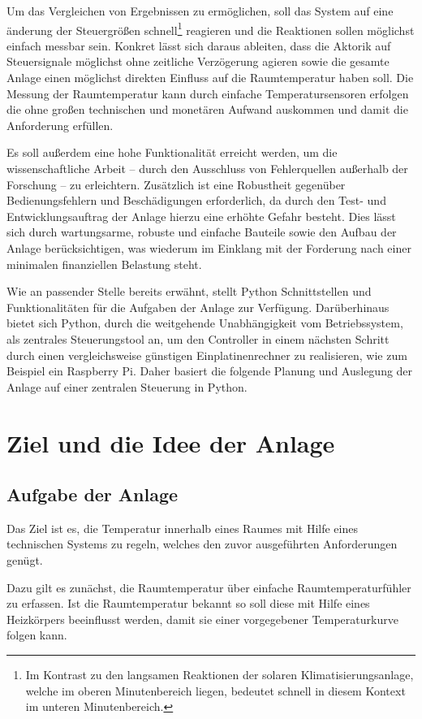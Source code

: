 Um das Vergleichen von Ergebnissen zu ermöglichen, soll das System auf eine änderung der Steuergrößen schnell\footnote{Im Kontrast zu den langsamen Reaktionen der solaren Klimatisierungsanlage, welche im oberen Minutenbereich liegen, bedeutet schnell in diesem Kontext im unteren Minutenbereich.} reagieren und die Reaktionen sollen möglichst einfach messbar sein. 
Konkret lässt sich daraus ableiten, dass die Aktorik auf Steuersignale möglichst ohne zeitliche Verzögerung agieren sowie die gesamte Anlage einen möglichst direkten Einfluss auf die Raumtemperatur haben soll. 
Die Messung der Raumtemperatur kann durch einfache Temperatursensoren erfolgen die ohne großen technischen und monetären Aufwand auskommen und damit die Anforderung erfüllen.

Es soll außerdem eine hohe Funktionalität erreicht werden, um die wissenschaftliche Arbeit -- durch den Ausschluss von Fehlerquellen außerhalb der Forschung -- zu erleichtern. 
Zusätzlich ist eine Robustheit gegenüber Bedienungsfehlern und Beschädigungen erforderlich, da durch den Test- und Entwicklungsauftrag der Anlage hierzu eine erhöhte Gefahr besteht. Dies lässt sich durch wartungsarme, robuste und einfache Bauteile sowie den Aufbau der Anlage berücksichtigen, was wiederum im Einklang mit der Forderung nach einer minimalen finanziellen Belastung steht.

Wie an passender Stelle bereits erwähnt, stellt Python Schnittstellen und Funktionalitäten für die Aufgaben der Anlage zur Verfügung. Darüberhinaus bietet sich Python, durch die weitgehende Unabhängigkeit vom Betriebssystem, als zentrales Steuerungstool an, um den Controller in einem nächsten Schritt durch einen vergleichsweise günstigen Einplatinenrechner zu realisieren, wie zum Beispiel ein Raspberry Pi. Daher basiert die folgende Planung und Auslegung der Anlage auf einer zentralen Steuerung in Python.

\section{Ziel und die Idee der Anlage}


\subsection{Aufgabe der Anlage}
Das Ziel ist es, die Temperatur innerhalb eines Raumes mit Hilfe eines technischen Systems zu regeln, welches den zuvor ausgeführten Anforderungen genügt.

Dazu gilt es zunächst, die Raumtemperatur über einfache Raumtemperaturfühler zu erfassen. Ist die Raumtemperatur bekannt so soll diese mit Hilfe eines Heizkörpers beeinflusst werden, damit sie einer vorgegebener Temperaturkurve folgen kann. 

